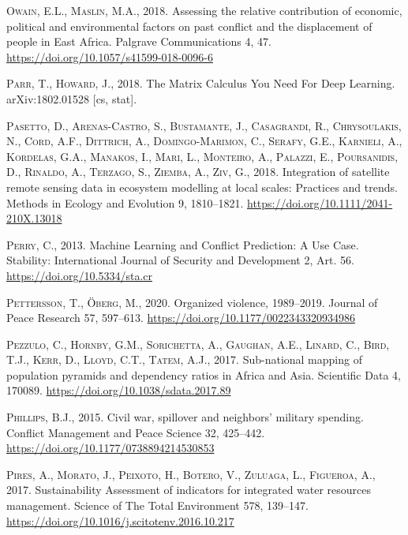 \documentclass[a4paper,11pt]{article}
\begin{document}
\leavevmode\hypertarget{ref-owain2018}{}%
\textsc{Owain, E.L., Maslin, M.A.}, 2018. Assessing the relative contribution of economic, political and environmental factors on past conflict and the displacement of people in East Africa. Palgrave Communications 4, 47. \url{https://doi.org/10.1057/s41599-018-0096-6}

\leavevmode\hypertarget{ref-parr2018}{}%
\textsc{Parr, T., Howard, J.}, 2018. The Matrix Calculus You Need For Deep Learning. arXiv:1802.01528 {[}cs, stat{]}.

\leavevmode\hypertarget{ref-pasetto2018}{}%
\textsc{Pasetto, D., Arenas-Castro, S., Bustamante, J., Casagrandi, R., Chrysoulakis, N., Cord, A.F., Dittrich, A., Domingo-Marimon, C., Serafy, G.E., Karnieli, A., Kordelas, G.A., Manakos, I., Mari, L., Monteiro, A., Palazzi, E., Poursanidis, D., Rinaldo, A., Terzago, S., Ziemba, A., Ziv, G.}, 2018. Integration of satellite remote sensing data in ecosystem modelling at local scales: Practices and trends. Methods in Ecology and Evolution 9, 1810--1821. \url{https://doi.org/10.1111/2041-210X.13018}

\leavevmode\hypertarget{ref-perry2013}{}%
\textsc{Perry, C.}, 2013. Machine Learning and Conflict Prediction: A Use Case. Stability: International Journal of Security and Development 2, Art. 56. \url{https://doi.org/10.5334/sta.cr}

\leavevmode\hypertarget{ref-pettersson2020}{}%
\textsc{Pettersson, T., Öberg, M.}, 2020. Organized violence, 1989--2019. Journal of Peace Research 57, 597--613. \url{https://doi.org/10.1177/0022343320934986}

\leavevmode\hypertarget{ref-pezzulo2017}{}%
\textsc{Pezzulo, C., Hornby, G.M., Sorichetta, A., Gaughan, A.E., Linard, C., Bird, T.J., Kerr, D., Lloyd, C.T., Tatem, A.J.}, 2017. Sub-national mapping of population pyramids and dependency ratios in Africa and Asia. Scientific Data 4, 170089. \url{https://doi.org/10.1038/sdata.2017.89}

\leavevmode\hypertarget{ref-phillips2015}{}%
\textsc{Phillips, B.J.}, 2015. Civil war, spillover and neighbors' military spending. Conflict Management and Peace Science 32, 425--442. \url{https://doi.org/10.1177/0738894214530853}

\leavevmode\hypertarget{ref-pires2017}{}%
\textsc{Pires, A., Morato, J., Peixoto, H., Botero, V., Zuluaga, L., Figueroa, A.}, 2017. Sustainability Assessment of indicators for integrated water resources management. Science of The Total Environment 578, 139--147. \url{https://doi.org/10.1016/j.scitotenv.2016.10.217}
\end{document}
